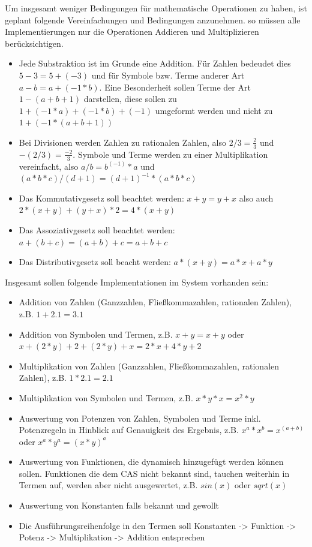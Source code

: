 \documentclass[11pt,a4paper, ngerman]{article}
\begin{document}
Um insgesamt weniger Bedingungen für mathematische Operationen zu haben, ist geplant folgende Vereinfachungen und Bedingungen anzunehmen. so müssen alle Implementierungen nur die Operationen Addieren und Multiplizieren berücksichtigen.
\begin{itemize}
    \item Jede Substraktion ist im Grunde eine Addition. Für Zahlen bedeudet dies $5-3 = 5+(-3)$ und für Symbole bzw. Terme anderer Art $a-b = a+(-1 * b)$. Eine Besonderheit sollen Terme der Art $1-(a+b+1)$ darstellen, diese sollen zu $1+(-1*a)+(-1*b)+(-1)$ umgeformt werden und nicht zu $1+(-1*(a+b+1))$
    \item Bei Divisionen werden Zahlen zu rationalen Zahlen, also $2/3 = \frac{2}{3}$ und $-(2/3) = \frac{-2}{3}$. Symbole und Terme werden zu einer Multiplikation vereinfacht, also $a/b = b^{(-1)} * a$ und $(a*b*c)/(d+1) = (d+1)^{-1} * (a*b*c)$
    \item Das Kommutativgesetz soll beachtet werden: $x+y = y+x$ also auch $2*(x+y) + (y+x)*2 = 4*(x+y)$
    \item Das Assoziativgesetz soll beachtet werden: $a+(b+c) = (a+b)+c = a+b+c$
    \item Das Distributivgesetz soll beacht werden: $a*(x+y) = a*x + a*y$
\end{itemize}

Insgesamt sollen folgende Implementationen im System vorhanden sein:
\begin{itemize}
    \item Addition von Zahlen (Ganzzahlen, Fließkommazahlen, rationalen Zahlen), z.B. $1+2.1 = 3.1$
    \item Addition von Symbolen und Termen, z.B. $x+y = x+y$ oder $x+(2*y)+2+(2*y)+x = 2*x+4*y+2$
    \item Multiplikation von Zahlen (Ganzzahlen, Fließkommazahlen, rationalen Zahlen), z.B. $1*2.1 = 2.1$
    \item Multiplikation von Symbolen und Termen, z.B. $x*y*x = x^2*y$
    \item Auswertung von Potenzen von Zahlen, Symbolen und Terme inkl. Potenzregeln in Hinblick auf Genauigkeit des Ergebnis, z.B. $x^a*x^b=x^(a+b)$ oder $x^a*y^a = (x*y)^a$
    \item Auswertung von Funktionen, die dynamisch hinzugefügt werden können sollen. Funktionen die dem CAS nicht bekannt sind, tauchen weiterhin in Termen auf, werden aber nicht ausgewertet, z.B. $sin(x)$ oder $sqrt(x)$
    \item Auswertung von Konstanten falls bekannt und gewollt
    \item Die Ausführungsreihenfolge in den Termen soll Konstanten -> Funktion -> Potenz -> Multiplikation -> Addition entsprechen
\end{itemize}
\end{document}
